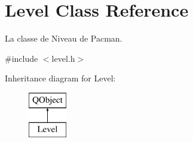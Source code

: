 \hypertarget{class_level}{}\section{Level Class Reference}
\label{class_level}


La classe de Niveau de Pacman.  




{\ttfamily \#include $<$level.\+h$>$}

Inheritance diagram for Level\+:\begin{figure}[H]
\begin{center}
\leavevmode
\includegraphics[height=2.000000cm]{class_level}
\end{center}
\end{figure}
